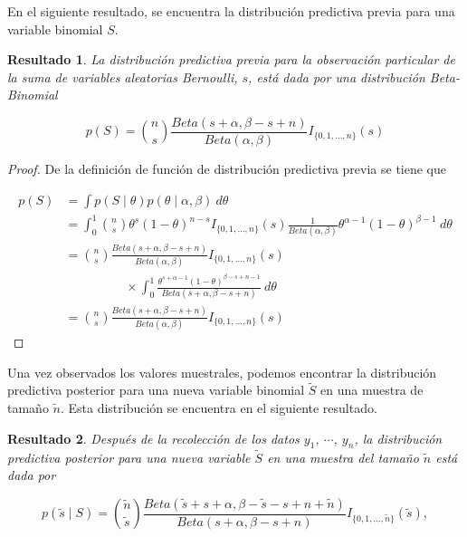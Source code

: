 \documentclass[
  12pt,
  spanish,
]{book}
\newtheorem{proposition}{Resultado}[chapter]
\theoremstyle{definition}
\theoremstyle{definition}
\theoremstyle{definition}
\theoremstyle{definition}
\theoremstyle{remark}
\begin{document}
En el siguiente resultado, se encuentra la distribución predictiva
previa para una variable binomial \(S\).

\begin{proposition}
\protect\hypertarget{prp:unnamed-chunk-13}{}{\label{prp:unnamed-chunk-13} }La distribución predictiva previa para la observación particular de la suma de variables aleatorias Bernoulli, \(s\), está dada por una distribución Beta-Binomial

\begin{equation}
p(S)=\binom{n}{s}\frac{Beta(s+\alpha,\beta-s+n)}{Beta(\alpha,\beta)}I_{\{0,1,\ldots,n\}}(s)
\end{equation}
\end{proposition}

\begin{proof}
\iffalse{} {Prueba. } \fi{}De la definición de función de distribución predictiva previa se tiene que

\begin{align*}
p(S)
&=\int p(S \mid \theta)p(\theta \mid \alpha,\beta)\ d\theta\\
&=\int_0^1\binom{n}{s}\theta^s(1-\theta)^{n-s}I_{\{0,1,\ldots,n\}}(s)
\frac{1}{Beta(\alpha,\beta)}\theta^{\alpha-1}(1-\theta)^{\beta-1}\ d\theta\\
&=\binom{n}{s}\frac{Beta(s+\alpha,\beta-s+n)}{Beta(\alpha,\beta)}I_{\{0,1,\ldots,n\}}(s)\\
&\hspace{2cm}\times\int_0^1\frac{\theta^{s+\alpha-1}(1-\theta)^{\beta-s+n-1}}{Beta(s+\alpha,\beta-s+n)}\ d\theta\\
&=\binom{n}{s}\frac{Beta(s+\alpha,\beta-s+n)}{Beta(\alpha,\beta)}I_{\{0,1,\ldots,n\}}(s)
\end{align*}
\end{proof}

Una vez observados los valores muestrales, podemos encontrar la
distribución predictiva posterior para una nueva variable binomial
\(\tilde{S}\) en una muestra de tamaño \(\tilde{n}\). Esta distribución se
encuentra en el siguiente resultado.

\begin{proposition}
\protect\hypertarget{prp:ResPredBinom}{}{\label{prp:ResPredBinom} }Después de la recolección de los datos \(y_1\), \(\cdots\), \(y_n\), la distribución predictiva posterior para una nueva variable \(\tilde{S}\) en una muestra del tamaño \(\tilde{n}\) está dada por

\begin{equation}
\label{eq:Binompredict}
p(\tilde{s} \mid S)=\binom{\tilde{n}}{\tilde{s}}\frac{Beta(\tilde{s}+s+\alpha,\beta-\tilde{s}-s+n+\tilde{n})}{Beta(s+\alpha,\beta-s+n)}I_{\{0,1,\ldots,\tilde{n}\}}(\tilde{s}),
\end{equation}
\end{proposition}
\end{document}
